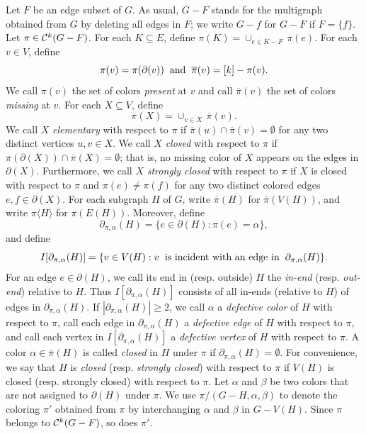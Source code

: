 \documentclass[11pt]{article}
\begin{document}
Let $F$ be an edge subset of $G$. As usual, $G-F$ stands for the multigraph obtained from $G$ by deleting all
edges in $F$; we write $G-f$ for $G-F$ if $F=\{f\}$. Let $\pi \in {\cal C}^k(G-F)$. For each $K \subseteq E$, 
define $\pi(K)=\cup_{e\in K-F} \, \pi(e)$. For each $v \in V$, define 
\[\pi(v)=\pi(\partial(v)) \hskip 2mm {\rm and} \hskip 2mm \overline{\pi}(v)=[k]-\pi(v).\] 
We call $\pi(v)$ the set of colors {\em present} at $v$ and call $\overline{\pi}(v)$ the set of colors {\em missing}\label{missingcolor}
at $v$.  For each $X\subseteq V$, define 
\[\overline{\pi}(X)= \cup_{v\in X} \, \overline{\pi}(v).\] 
We call $X$ {\em elementary}\label{elementaryset} with respect to $\pi$ if $\overline{\pi}(u) \cap \overline{\pi}(v)
=\emptyset$ for any two distinct vertices $u, v\in X$. We call $X$ {\em closed}\label{closedsets} with respect to $\pi$ if
$\pi(\partial(X))\cap \overline{\pi}(X)=\emptyset$; that is, no missing color of $X$ appears on the 
edges in $\partial(X)$.  Furthermore, we call $X$ {\em strongly closed}\label{sclosed} with respect to $\pi$ if $X$ is closed
with respect to $\pi$ and $\pi(e) \ne \pi(f)$ for any two distinct colored edges $e, f \in 
\partial(X)$.  For each subgraph $H$ of $G$, write $\overline{\pi}(H)$ for $\overline{\pi}(V(H))$,
and write ${\pi}\langle H \rangle$ for ${\pi}(E(H))$. Moreover, define 
\[\partial_{\pi, \alpha}(H)=\{e\in \partial(H): \pi(e)=\alpha\},\] 
and define 
\[I[\partial_{\pi, \alpha}(H)]=\{v\in V(H): v \hskip 2mm \mbox{is incident with an edge in} \hskip 2mm
\partial_{\pi, \alpha}(H)\}.\] 
For an edge $e\in \partial(H)$, we call its end in (resp. outside) $H$ the {\em in-end} (resp. {\em out-end})
relative to $H$.  Thus $I[\partial_{\pi, \alpha}(H)]$ consists of all in-ends (relative to $H$) of edges in 
$\partial_{\pi, \alpha}(H)$. If $|\partial_{\pi, \alpha}(H)| \ge 2$, we call $\alpha$ a {\em defective color}\label{defectivecolor} 
of $H$ with respect to $\pi$, call each edge in $\partial_{\pi, \alpha}(H)$ a {\em defective edge}\label{defectiveedge} of $H$ with 
respect to $\pi$, and call each vertex in $I[\partial_{\pi, \alpha}(H)]$ a {\em defective vertex}\label{defectivevertex} of $H$ with 
respect to $\pi$. A color $\alpha \in \overline{\pi}(H)$ is called {\em closed} in $H$ under $\pi$ 
if $\partial_{\pi, \alpha}(H)=\emptyset$.  For convenience, we say that $H$ is {\em closed} (resp. {\em strongly closed}) 
with respect to $\pi$ if $V(H)$ is closed (resp. strongly closed) with respect to $\pi$. Let $\alpha$ and $\beta$ be 
two colors that are not assigned to $\partial(H)$ under $\pi$. We use $\pi/(G-H, \alpha, \beta)$ to denote the 
coloring $\pi'$ obtained from $\pi$ by interchanging $\alpha$ and $\beta$ in $G-V(H)$. Since 
$\pi$ belongs to ${\cal C}^k(G-F)$, so does $\pi'$.   
\end{document}
